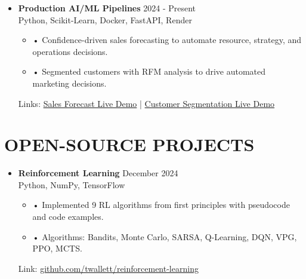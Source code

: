 \documentclass[a4paper,9pt]{extarticle}
\newcommand{\shorturl}[2]{%
  \href{#1}{#2}%
}
\begin{document}
\begin{itemize}[leftmargin=0.4cm, label={}]
    \item \textbf{Production AI/ML Pipelines} \hfill 2024 - Present \\
    Python, Scikit-Learn, Docker, FastAPI, Render
    \begin{itemize}[leftmargin=0.3cm, label={}]
    \item \small{•} \normalsize{Confidence-driven sales forecasting to automate resource, strategy, and operations decisions.} 
    \item \small{•} \normalsize{Segmented customers with RFM analysis to drive automated marketing decisions.}
    \end{itemize}
    Links: \href{https://twallett.com/sales-forecast}{Sales Forecast Live Demo} | \href{https://twallett.com/customer-segmentation}{Customer Segmentation Live Demo} 
\end{itemize}



\section*{OPEN-SOURCE PROJECTS}


\begin{itemize}[leftmargin=0.4cm, label={}]
    \item \textbf{Reinforcement Learning} \hfill December 2024 \\
    Python, NumPy, TensorFlow
    \begin{itemize}[leftmargin=0.3cm, label={}]
    \item \small{•} \normalsize{Implemented 9 RL algorithms from first principles with pseudocode and code examples.} 
    \item \small{•} \normalsize{Algorithms: Bandits, Monte Carlo, SARSA, Q-Learning, DQN, VPG, PPO, MCTS.} 
    \end{itemize}
    Link: \shorturl{https://github.com/twallett/reinforcement-learning}{github.com/twallett/reinforcement-learning}
\end{itemize}
\end{document}
